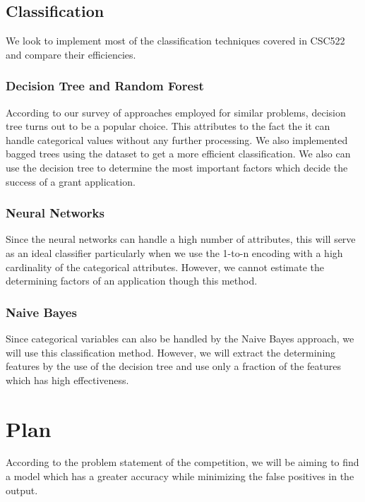 \documentclass{article} %
\begin{document}
\subsection{Classification}

We look to implement most of the classification techniques covered in CSC522 and compare their efficiencies.

\subsubsection{Decision Tree and Random Forest}
According to our survey of approaches employed for similar problems, decision tree turns out to be a popular choice. This attributes to the fact the it can handle categorical values without any further processing. We also implemented bagged trees using the dataset to get a more efficient classification. We also can use the decision tree to determine the most important factors which decide the success of a grant application.

\subsubsection{Neural Networks}
Since the neural networks can handle a high number of attributes, this will serve as an ideal classifier particularly when we use the 1-to-n encoding with a high cardinality of the categorical attributes. However, we cannot estimate the determining factors of an application though this method.

\subsubsection{Naive Bayes}
Since categorical variables can also be handled by the Naive Bayes approach, we will use this classification method. However, we will extract the determining features by the use of the decision tree and use only a fraction of the features which has high effectiveness. 


\section{Plan}
According to the problem statement of the competition, we will be aiming to find a model which has a greater accuracy while minimizing the false positives in the output.
\end{document}

